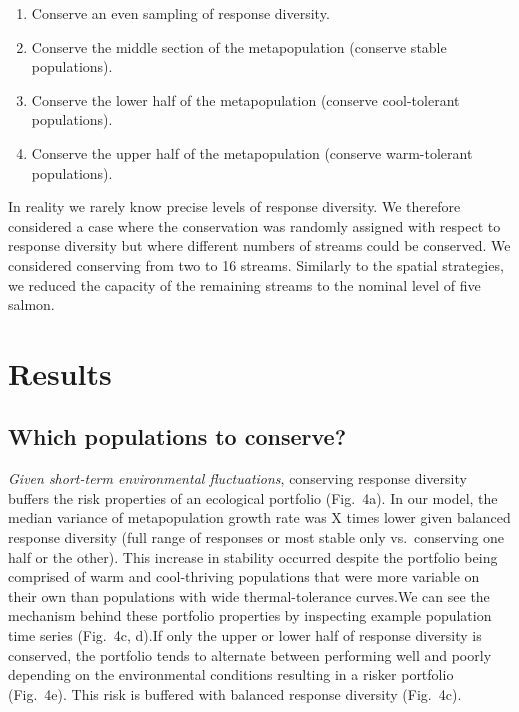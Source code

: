 \begin{enumerate}
\def\labelenumi{\arabic{enumi}.}
\itemsep1pt\parskip0pt
\item
  Conserve an even sampling of response diversity.
\item
  Conserve the middle section of the metapopulation (conserve stable populations).
\item
  Conserve the lower half of the metapopulation (conserve cool-tolerant populations).
\item
  Conserve the upper half of the metapopulation (conserve warm-tolerant populations).
\end{enumerate}

In reality we rarely know precise levels of response diversity. We therefore considered a case where the conservation was randomly assigned with respect to response diversity but where different numbers of streams could be conserved. We considered conserving from two to 16 streams. Similarly to the spatial strategies, we reduced the capacity of the remaining streams to the nominal level of five salmon.

\section{Results}

\subsection{Which populations to conserve?}

\emph{Given short-term environmental fluctuations}, conserving response diversity buffers the risk properties of an ecological portfolio (Fig.~4a). In our model, the median variance of metapopulation growth rate was X times lower given balanced response diversity (full range of responses or most stable only vs.~conserving one half or the other). This increase in stability occurred despite the portfolio being comprised of warm and cool-thriving populations that were more variable on their own than populations with wide thermal-tolerance curves.We can see the mechanism behind these portfolio properties by inspecting example population time series (Fig.~4c, d).If only the upper or lower half of response diversity is conserved, the portfolio tends to alternate between performing well and poorly depending on the environmental conditions resulting in a risker portfolio (Fig.~4e). This risk is buffered with balanced response diversity (Fig.~4c).

